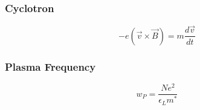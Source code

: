 \subsubsection*{Cyclotron}
\begin{equation}
    -e (\vec{v} \times \vec{B}) =  m \frac{d\vec{v}}{dt}
\end{equation}

\subsubsection*{Plasma Frequency}

\begin{equation}
    w_P = \frac{Ne^2}{\epsilon_L m^*}
\end{equation}